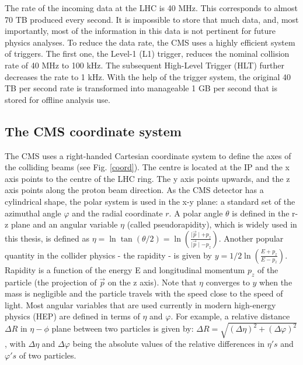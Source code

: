 \begin{normalsize}
The rate of the incoming data at the LHC is 40 MHz. This corresponds to almost 70 TB produced every second. It is impossible to store that much data, and, most importantly, most of the information in this data is not pertinent for future physics analyses. To reduce the data rate, the CMS uses a highly efficient system of triggers. The first one, the Level-1 (L1) trigger, reduces the nominal collision rate of 40 MHz to 100 kHz. The subsequent High-Level Trigger (HLT) further decreases the rate to 1 kHz. With the help of the trigger system, the original 40 TB per second rate is transformed into manageable 1 GB per second that is stored for offline analysis use. 




\subsection{The CMS coordinate system}

The CMS uses a right-handed Cartesian coordinate system to define the axes of the colliding beams (see Fig. \ref{coord}). The centre is located at the IP and the x axis points to the centre of the LHC ring. The y axis points upwards, and the z axis points along the proton beam direction. As the CMS detector has a cylindrical shape, the polar system is used in the x-y plane: a standard set of the azimuthal angle $\varphi$ and the radial coordinate $r$. A polar angle $\theta$ is defined in the r-z plane and an angular variable $\eta$ (called pseudorapidity), which is widely used in this thesis, is defined as $\eta = \ln \tan(\theta/2) = \ln (\frac{\mid \vec{p}\mid + p_z}{\mid \vec{p}\mid - p_z})$. Another popular quantity in the collider physics - the rapidity - is given by $y = 1/2 \ln ( \frac{E + p_z}{E - p_z})$. Rapidity is a function of the energy E and longitudinal momentum $p_z$ of the particle (the projection of $\vec{p}$ on the z axis). 
Note that $\eta$ converges to $y$ when the mass is negligible and the particle travels with the speed close to the speed of light. Most angular variables that are used currently in modern high-energy physics (HEP) are defined in terms of $\eta$ and $\varphi$. For example, a relative distance $\Delta R$ in $\eta - \phi$ plane between two particles is given by:
$ \Delta R = \sqrt{(\Delta \eta)^2 + (\Delta \varphi)^2}$, with $\Delta \eta$ and $\Delta \varphi$ being the absolute values of the relative differences in $\eta's$ and $\varphi 's$ of two particles. 


\end{normalsize}
